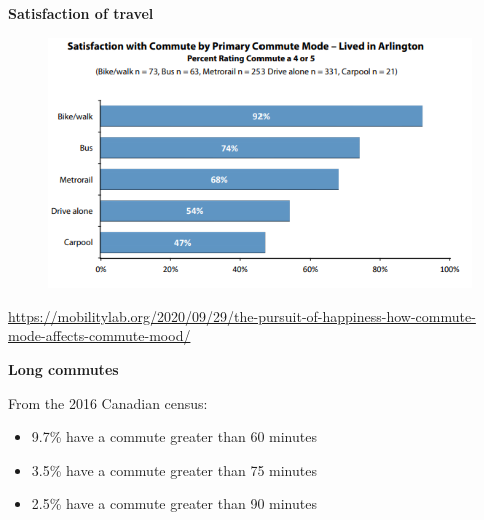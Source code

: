 \documentclass[aspectratio=169]{beamer}
\begin{document}
\begin{frame}
	
	\textbf{Satisfaction of travel}
	
	\begin{figure}
		\centering
		\includegraphics[width=0.7\linewidth]{images/mode_satisfaction.png}
	\end{figure}
	
	\tiny\url{https://mobilitylab.org/2020/09/29/the-pursuit-of-happiness-how-commute-mode-affects-commute-mood/}
	
\end{frame}



\begin{frame}
	
	\textbf{Long commutes}
	
	\vspace{4mm}
	
	From the 2016 Canadian census:
	
	\begin{itemize}
		\item 9.7\% have a commute greater than 60 minutes
		
		\item 3.5\% have a commute greater than 75 minutes
		
		\item 2.5\% have a commute greater than 90 minutes
	\end{itemize}
	
\end{frame}
\end{document}
